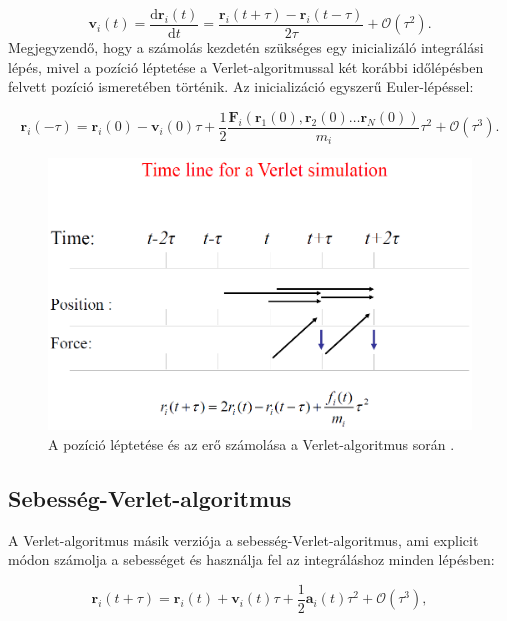\documentclass[12pt]{article}
\theoremstyle{plain}
\newcommand{\dd}{\textrm{d}}
\begin{document}
\begin{equation}
	\mathbf{v}_i(t) = \frac{\dd \mathbf{r}_i(t)}{\dd t} = \frac{\mathbf{r}_i(t+\tau) - \mathbf{r}_i(t-\tau)}{2 \tau} + \mathcal{O}(\tau^2).
	\label{eq:Verlet_vel}
\end{equation}
Megjegyzendő, hogy a számolás kezdetén szükséges egy inicializáló integrálási lépés, mivel a pozíció léptetése a Verlet-algoritmussal két korábbi időlépésben felvett pozíció ismeretében történik. Az inicializáció egyszerű Euler-lépéssel:

\begin{equation}
	\mathbf{r}_i(-\tau) = \mathbf{r}_i(0) - \mathbf{v}_i(0) \tau + \frac{1}{2} \frac{ \mathbf{F}_i(\mathbf{r}_1 (0), \mathbf{r}_2 (0) \dots \mathbf{r}_N (0))}{m_i} \tau^2 + \mathcal{O}(\tau^3).
	\label{eq:Verlet_init}
\end{equation}


\begin{figure}
	\centering
	\includegraphics[width=0.5\linewidth]{media/Verlet_timeline}
	\caption{A pozíció léptetése és az erő számolása a Verlet-algoritmus során \cite{lecture}.}
	\label{fig:verlettimeline}
\end{figure}


\subsection{Sebesség-Verlet-algoritmus}

A Verlet-algoritmus másik verziója a sebesség-Verlet-algoritmus, ami explicit módon számolja a sebességet és használja fel az integráláshoz minden lépésben:

\begin{equation}
	\mathbf{r}_i (t+\tau) = \mathbf{r}_i(t) + \mathbf{v}_i(t) \tau + \frac{1}{2} \mathbf{a}_i(t) \tau^2 + \mathcal{O}(\tau^3),
	\label{eq:velVerlet_pos}
\end{equation}
\end{document}
